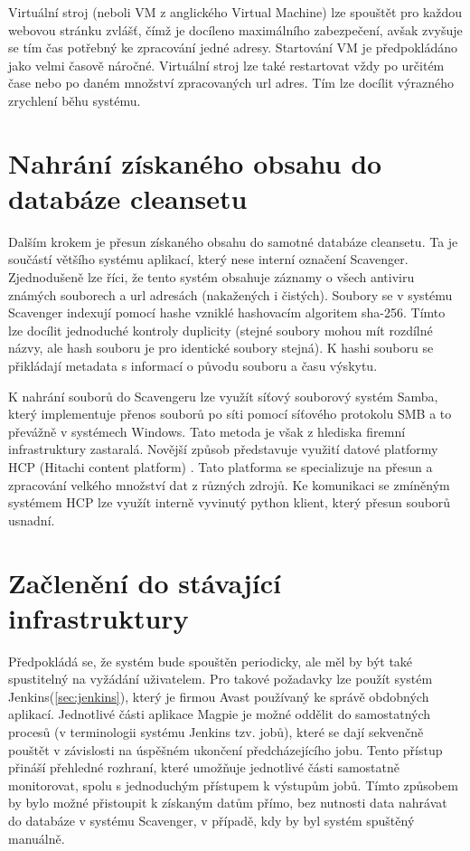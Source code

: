 \documentclass[thesis=M,czech,hidelinks]{FITthesis}[2013/05/06]
\begin{document}
Virtuální stroj (neboli VM z anglického Virtual Machine) lze spouštět pro každou webovou stránku zvlášť, čímž je docíleno maximálního zabezpečení, avšak zvyšuje se tím čas potřebný ke zpracování jedné adresy. Startování VM je předpokládáno jako velmi časově náročné.  Virtuální stroj lze také restartovat vždy po určitém čase nebo po daném množství zpracovaných url adres. Tím lze docílit výrazného zrychlení běhu systému.





\section{Nahrání získaného obsahu do databáze cleansetu}
Dalším krokem je přesun získaného obsahu do samotné databáze cleansetu. Ta je součástí většího systému aplikací, který nese interní označení Scavenger. Zjednodušeně lze říci, že tento systém obsahuje záznamy o všech antiviru známých souborech a url adresách (nakažených i čistých). Soubory se v systému Scavenger indexují pomocí hashe vzniklé hashovacím algoritem sha-256. Tímto lze docílit jednoduché kontroly duplicity (stejné soubory mohou mít rozdílné názvy, ale hash souboru je pro identické soubory stejná). K hashi souboru se přikládají metadata s informací o původu souboru a času výskytu. 

K nahrání souborů do Scavengeru lze využít síťový souborový systém Samba, který implementuje přenos souborů po síti pomocí síťového protokolu SMB a to převážně v systémech Windows. Tato metoda je však z hlediska firemní infrastruktury zastaralá. Novější způsob představuje využití datové platformy HCP (Hitachi content platform) \cite{hcp}. Tato platforma se specializuje na přesun a zpracování velkého množství dat z různých zdrojů. Ke komunikaci se zmíněným systémem HCP lze využít interně vyvinutý python klient, který přesun souborů usnadní.





\section{Začlenění do stávající infrastruktury}
Předpokládá se, že systém bude spouštěn periodicky, ale měl by být také spustitelný na vyžádání uživatelem. Pro takové požadavky lze použít systém Jenkins(\ref{sec:jenkins}), který je firmou Avast používaný ke správě obdobných aplikací. Jednotlivé části aplikace Magpie je možné oddělit do samostatných procesů (v terminologii systému Jenkins tzv. jobů), které se dají sekvenčně pouštět v závislosti na úspěšném ukončení předcházejícího jobu. Tento přístup přináší přehledné rozhraní, které umožňuje jednotlivé části samostatně monitorovat, spolu s jednoduchým přístupem k výstupům jobů. Tímto způsobem by bylo možné přistoupit k získaným datům přímo, bez nutnosti data nahrávat do databáze v systému Scavenger, v případě, kdy by byl systém spuštěný manuálně.
\end{document}
